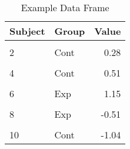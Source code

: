 \begin{table}[!h]
\centering
\begin{tabular}{llr}
\toprule
Subject & Group & Value\\
\midrule
\cellcolor{gray!10}{1} & \cellcolor{gray!10}{Exp} & \cellcolor{gray!10}{-0.36}\\
2 & Cont & 0.28\\
\cellcolor{gray!10}{3} & \cellcolor{gray!10}{Exp} & \cellcolor{gray!10}{1.54}\\
4 & Cont & 0.51\\
\cellcolor{gray!10}{5} & \cellcolor{gray!10}{Exp} & \cellcolor{gray!10}{-1.28}\\
6 & Exp & 1.15\\
\cellcolor{gray!10}{7} & \cellcolor{gray!10}{Cont} & \cellcolor{gray!10}{3.78}\\
8 & Exp & -0.51\\
\cellcolor{gray!10}{9} & \cellcolor{gray!10}{Cont} & \cellcolor{gray!10}{NA}\\
10 & Cont & -1.04\\
\bottomrule
\end{tabular}
\caption{Example Data Frame}
\label{tab:data_frame_ex}
\end{table}